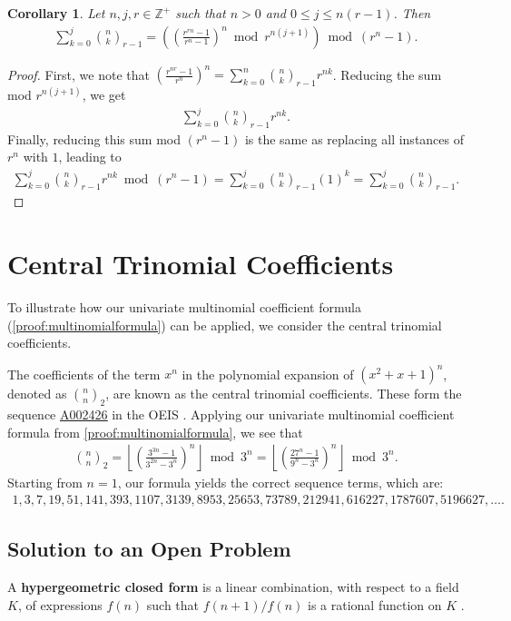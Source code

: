 \documentclass[10pt,a4paper]{article}
\theoremstyle{plain}
\newtheorem{corollary}{Corollary}[section]
\newcommand{\floor}[1]{\left\lfloor #1 \right\rfloor}
\newcommand{\seqnum}[1]{\href{https://oeis.org/#1}{\rm \underline{#1}}}
\begin{document}
\begin{corollary} \label{proof:multinomialcoeffpartialsums}
Let $n,j,r \in \mathbb{Z}^+$ such that $n > 0$ and $0 \leq j \leq n (r-1)$. Then
\begin{align*}
\sum_{k=0}^{j} \binom{n}{k}_{r-1}
= \left( \left( \frac{r^{rn}-1}{r^n-1} \right)^n \bmod r^{n(j+1)} \right) \bmod (r^n-1) .
\end{align*}
\end{corollary}
\begin{proof}
First, we note that $\left(\frac{r^{nr}-1}{r^n}\right)^n = \sum_{k=0}^n \binom{n}{k}_{r-1} r^{nk}$. Reducing the sum mod $r^{n(j+1)}$, we get
\begin{align*}
    \sum_{k=0}^{j} \binom{n}{k}_{r-1} r^{nk} .
\end{align*}
Finally, reducing this sum mod $(r^n-1)$ is the same as replacing all instances of $r^n$ with $1$, leading to
\begin{align*}
    \sum_{k=0}^{j} \binom{n}{k}_{r-1} r^{nk} \bmod (r^n-1)
    = \sum_{k=0}^{j} \binom{n}{k}_{r-1} (1)^{k}
    = \sum_{k=0}^{j} \binom{n}{k}_{r-1} .
\end{align*}
\end{proof}

\section{Central Trinomial Coefficients}
To illustrate how our univariate multinomial coefficient formula (\cref{proof:multinomialformula}) can be applied, we consider the central trinomial coefficients.

The coefficients of the term $x^n$ in the polynomial expansion of $(x^2+x+1)^n$, denoted as $\binom{n}{n}_2$, are known as the central trinomial coefficients. These form the sequence \seqnum{A002426} in the OEIS \cite{A002426}. Applying our univariate multinomial coefficient formula from \cref{proof:multinomialformula}, we see that
\begin{align*}
    \binom{n}{n}_2 = \floor{\left(\frac{3^{3n} - 1}{3^{2n} - 3^n}\right)^n} \bmod 3^n
    = \floor{\left(\frac{27^n - 1}{9^n - 3^n}\right)^n} \bmod 3^n .
\end{align*}
Starting from $n=1$, our formula yields the correct sequence terms, which are:
\begin{align*}
1,3,7,19,51,141,393,1107,3139,8953,25653,73789,212941,616227,1787607,5196627, \ldots .
\end{align*}

\subsection{Solution to an Open Problem}
A \textbf{hypergeometric closed form} is a linear combination, with respect to a field $K$, of expressions $f(n)$ such that $f(n+1)/f(n)$ is a rational function on $K$ \cite{petkovsek1996ab, sauras2018thesis}.
\end{document}
